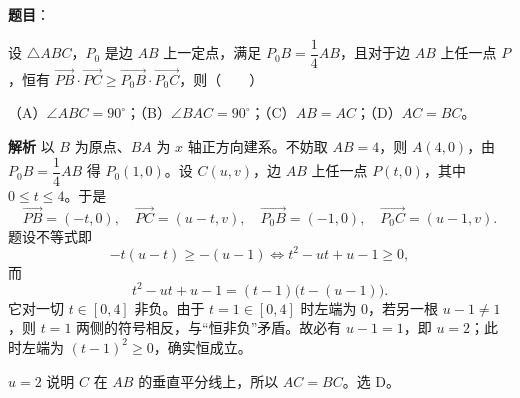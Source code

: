 \begin{answer}

\textbf{题目}：

设 $\triangle ABC$，$P_0$ 是边 $AB$ 上一定点，满足 $P_0B=\dfrac14AB$，且对于边 $AB$ 上任一点 $P$，恒有 $\overrightarrow{PB}\cdot\overrightarrow{PC}\geqslant\overrightarrow{P_0B}\cdot\overrightarrow{P_0C}$，则\mbox{（　　）}

（A）$\angle ABC=90^\circ$；（B）$\angle BAC=90^\circ$；（C）$AB=AC$；（D）$AC=BC$。

\textbf{解析}
以 $B$ 为原点、$BA$ 为 $x$ 轴正方向建系。不妨取 $AB=4$，则 $A(4,0)$，由 $P_0B=\dfrac14AB$ 得 $P_0(1,0)$。设 $C(u,v)$，边 $AB$ 上任一点 $P(t,0)$，其中 $0\leqslant t\leqslant4$。于是
\nopagebreak[4]
\[\overrightarrow{PB}=(-t,0),\quad \overrightarrow{PC}=(u-t,v),\quad \overrightarrow{P_0B}=(-1,0),\quad \overrightarrow{P_0C}=(u-1,v).\]
题设不等式即
\nopagebreak[4]
\[-t(u-t)\geqslant-(u-1)\Longleftrightarrow t^2-ut+u-1\geqslant0,\]
而
\nopagebreak[4]
\[t^2-ut+u-1=(t-1)\bigl(t-(u-1)\bigr).\]
它对一切 $t\in[0,4]$ 非负。由于 $t=1\in[0,4]$ 时左端为 $0$，若另一根 $u-1\neq1$，则 $t=1$ 两侧的符号相反，与“恒非负”矛盾。故必有 $u-1=1$，即 $u=2$；此时左端为 $(t-1)^2\geqslant0$，确实恒成立。

$u=2$ 说明 $C$ 在 $AB$ 的垂直平分线上，所以 $AC=BC$。选 D。


\end{answer}
